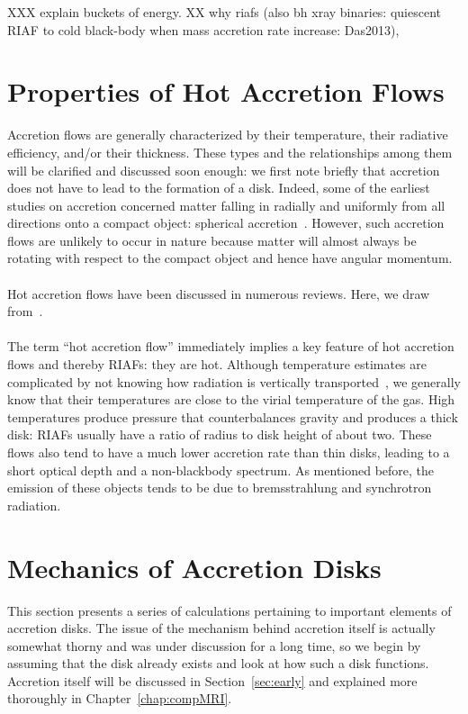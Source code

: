 XXX explain buckets of energy.
XX why riafs (also bh xray binaries: quiescent RIAF to cold black-body when mass accretion rate increase: Das2013), 


\section{Properties of Hot Accretion Flows} \label{sec:propertiesAF}
Accretion flows are generally characterized by their temperature, their radiative efficiency, and/or their thickness. These types and the relationships among them will be clarified and discussed soon enough: we first note briefly that accretion does not have to lead to the formation of a disk. Indeed, some of the earliest studies on accretion concerned matter falling in radially and uniformly from all directions onto a compact object: spherical accretion~\cite{Bondi?XX}. However, such accretion flows are unlikely to occur in nature because matter will almost always be rotating with respect to the compact object and hence have angular momentum. \\
\\
Hot accretion flows have been discussed in numerous reviews. Here, we draw from~\citet{Yuan2014}. \\
\\
The term ``hot accretion flow'' immediately implies a key feature of hot accretion flows and thereby RIAFs: they are hot. Although temperature estimates are complicated by not knowing how radiation is vertically transported~\cite{BH1998}, we generally know that their temperatures are close to the virial temperature of the gas. High temperatures produce pressure that counterbalances gravity and produces a thick disk: RIAFs usually have a ratio of radius to disk height of about two. These flows also tend to have a much lower accretion rate than thin disks, leading to a short optical depth and a non-blackbody spectrum. As mentioned before, the emission of these objects tends to be due to bremsstrahlung and synchrotron radiation. 




\section{Mechanics of Accretion Disks}\label{sec:mechanics}
This section presents a series of calculations pertaining to important elements of accretion disks. The issue of the mechanism behind accretion itself is actually somewhat thorny and was under discussion for a long time, so we begin by assuming that the disk already exists and look at how such a disk functions. Accretion itself will be discussed in Section~\ref{sec:early} and explained more thoroughly in Chapter~\ref{chap:compMRI}. 


